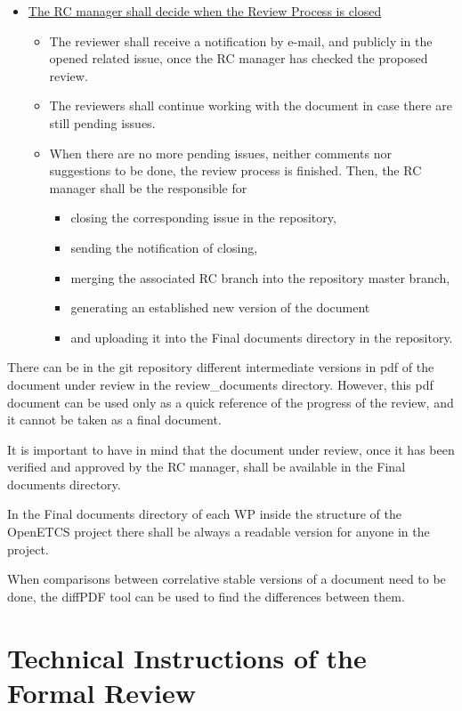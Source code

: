 \documentclass{template/openetcs_article}
\begin{document}
\begin{itemize}
\item \underline{The RC manager shall decide when the Review Process is closed}
\begin{itemize}
\item The reviewer shall receive a notification by e-mail, and publicly in the opened related issue, once the RC manager has checked the proposed review. 
\item The reviewers shall continue working with the document in case there are still pending issues.
\item When there are no more pending issues, neither comments nor suggestions to be done, the review process is finished. Then, the RC manager shall be the responsible for 
\begin{itemize}
\item closing the corresponding issue in the repository, 
\item sending the notification of closing, 
\item merging the associated RC branch into the repository master branch, 
\item generating an established new version of the document 
\item and uploading it into the Final documents directory in the repository.
\end{itemize}
\end{itemize}

\end{itemize}

There can be in the git repository different intermediate versions in pdf of the document under review in the review\_documents directory. However, this pdf document can be used only as a quick reference of the progress of the review, and it cannot be taken as a final document. 

It is important to have in mind that the document under review, once it has been verified and approved by the RC manager, shall be available in the Final documents directory.

In the Final documents directory of each WP inside the structure of the OpenETCS project there shall be always a readable version for anyone in the project. 

When comparisons between correlative stable versions of a document need to be done, the diffPDF tool can be used to find the differences between them.


\section{Technical Instructions of the Formal Review}
\end{document}
